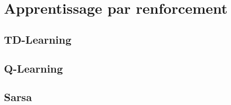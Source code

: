 \newpage
\section{Apprentissage par renforcement}


\subsection{TD-Learning}

\subsection{Q-Learning}

\subsection{Sarsa}
